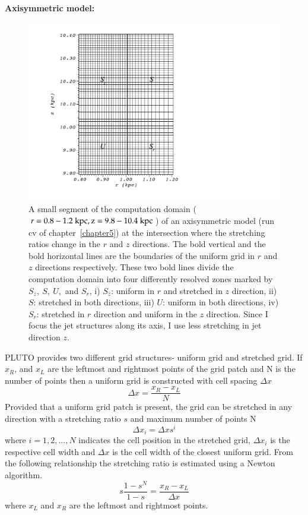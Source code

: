 \paragraph{Axisymmetric model:}
\begin{figure}
\centering
\includegraphics[width=\linewidth]{sgr.png}
\caption{A small segment of the computation domain ($r= 0.8 - 1.2~ \rm kpc, z = 9.8-10.4~\rm kpc$) of an axisymmetric model (run cv of chapter~\ref{chapter5}) at the intersection where the stretching ratios change in the $r$ and $z$ directions. The bold vertical and the bold horizontal lines are the boundaries of the uniform grid in $r$ and $z$ directions respectively. These two bold lines divide the computation domain into four differently resolved zones marked by $S_z, \ S, \ U,$ and $S_r$, i) $S_z$: uniform in  $r$ and stretched in $z$ direction, ii) $S$: stretched in both directions, iii) $U$: uniform in both directions, iv) $S_r$: stretched in $r$ direction and uniform in the $z$ direction. Since I focus the jet structures along its axis, I use less stretching in jet direction $z$.}
\label{f:sgr}
\end{figure}

PLUTO provides two different grid structures- uniform grid and stretched grid. If $x_R$, and $x_L$ are the leftmost and rightmost points of the grid patch and N is the number of  points then a uniform grid is constructed with cell spacing $\Delta x$
\begin{equation}
\Delta x = \frac{x_R-x_L}{N}
\end{equation} 
Provided that a uniform grid patch is present, the grid can be stretched in any direction with a stretching ratio $s$ and maximum number of points N
\begin{equation}
\Delta x_i = \Delta x s^i
\end{equation}
where $i = 1, 2, ..., N$ indicates the cell position in the stretched grid, $\Delta x_i$ is the respective cell width and $\Delta x$ is the cell width of the closest uniform grid.
From the following relationship the stretching ratio is estimated using a Newton algorithm. 
\begin{equation}
s\frac{1-s^N}{1-s}= \frac{x_R-x_L}{\Delta x}
\end{equation}
where $x_L$ and $x_R$ are the leftmost and rightmost points. 


